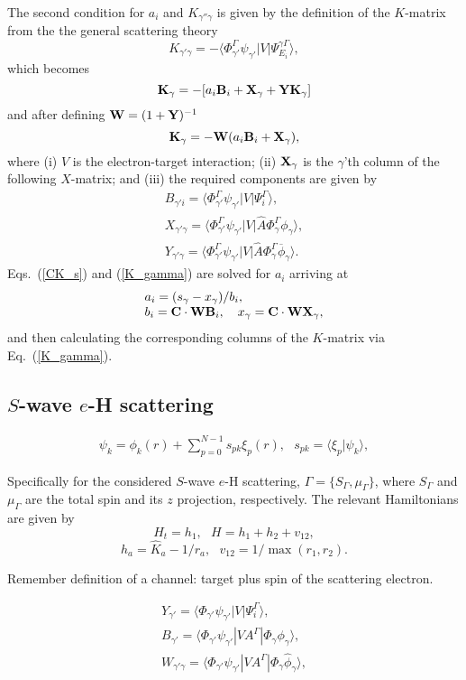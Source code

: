 \documentclass[aip
, pra
, showpacs
, aps
, twocolumn
, groupedaddress
, floatfix
]{revtex4}
\newcommand{\beq}{\begin{equation}}
\newcommand{\eeq}{\end{equation}}
\newcommand{\barr}{\begin{array}}
\newcommand{\earr}{\end{array}}
\begin{document}
The second condition for $a_i$ and $K_{\gamma'' \gamma}$ is given by the definition of the $K$-matrix from the the general scattering theory \cite{N82}
\beq
K_{\gamma' \gamma} = - \langle \Phi^\Gamma_{\gamma'}  \psi_{\gamma'}
| V | \Psi_{E_i}^{\gamma \Gamma} \rangle,
\eeq
which becomes
\beq
{\bf K}_\gamma = -[a_i {\bf B}_i + {\bf X}_\gamma + {\bf Y K}_\gamma]
\eeq
and after defining ${\bf W}=(1+{\bf Y})^{-1}$
\beq
{\bf K}_\gamma  = -{\bf W}   (a_i {\bf B}_i    + {\bf X}_\gamma), \label{K_gamma}
\eeq
where (i) $V$ is the electron-target interaction; (ii) ${\bf X}_\gamma$ is the $\gamma$'th column of the following $X$-matrix;
and (iii) the required components are given by
\beq \barr{l}
B_{\gamma' i} = \langle \Phi^\Gamma_{\gamma'}  \psi_{\gamma'} |V |\Psi_i^{\Gamma} \rangle,\\
X_{\gamma' \gamma} = \langle \Phi^\Gamma_{\gamma'}  \psi_{\gamma'} |V | \hat{A} \Phi^\Gamma_{\gamma} \phi_{\gamma} \rangle,\\
Y_{\gamma' \gamma} = \langle \Phi^\Gamma_{\gamma'}  \psi_{\gamma'} |V | \hat{A} \Phi^\Gamma_{\gamma} \overline{\phi}_{\gamma} \rangle.
\earr \label{Y_B_W} \eeq
Eqs.~(\ref{CK_s}) and (\ref{K_gamma}) are solved for $a_i$ arriving at
\beq \barr{l}
a_i = (s_\gamma - x_\gamma) / b_i,\\
b_i = {\bf C} \cdot {\bf W}  {\bf B}_i, \ \ \
x_\gamma = {\bf C} \cdot {\bf W}  {\bf X}_\gamma,
\earr \eeq
and then calculating the corresponding columns of the $K$-matrix via Eq.~(\ref{K_gamma}).



\subsection{$S$-wave $e$-H scattering}

\beq \barr{l}
\psi_k = \phi_k(r) +  \sum_{p=0}^{N-1} s_{pk} \xi_p(r), \ \ \ s_{pk} = \langle \xi_p | \psi_k \rangle,
\earr \label{Psi_} \eeq


Specifically for the considered $S$-wave $e$-H scattering,
$\Gamma=\{S_\Gamma,\mu_\Gamma\}$, where $S_\Gamma$ and $\mu_\Gamma$ are the total spin and its $z$ projection, respectively.
The relevant Hamiltonians are given by
\beq
H_t = h_1, \ \ \ H = h_1 + h_2 + v_{12},
\label{H_t} \eeq
\beq
h_a = \hat{K}_a  - 1/r_a,\ \ \ v_{12} = 1/\max{(r_{1}, r_{2})}.
\label{h_b} \eeq


Remember definition of a channel: target plus spin of the scattering electron.


\beq \barr{l}
Y_{\gamma'} = \langle \Phi_{\gamma'}  \psi_{\gamma'} |V|\Psi_i^{\Gamma} \rangle,\\
B_{\gamma'} = \langle  \Phi_{\gamma'}  \psi_{\gamma'} |VA^{\Gamma} |\Phi_{\gamma} \phi_{\gamma} \rangle,\\
W_{\gamma' \gamma} = \langle \Phi_{\gamma'}  \psi_{\gamma'} |V A^{\Gamma} |\Phi_{\gamma} \widehat{\phi}_{\gamma} \rangle,\\
\earr \label{Psi_} \eeq
\end{document}
